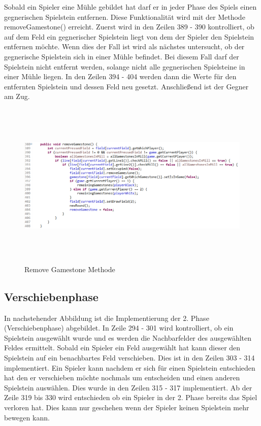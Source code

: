 \documentclass[oneside]{ausarbeitung}
\begin{document}
Sobald ein Spieler eine Mühle gebildet hat darf er in jeder Phase des Spiels einen gegnerischen Spielstein entfernen. Diese Funktionalität wird mit der Methode removeGamestone() erreicht. Zuerst wird in den Zeilen 389 - 390 kontrolliert, ob auf dem Feld ein gegnerischer Spielstein liegt von dem der Spieler den Spielstein entfernen möchte. Wenn dies der Fall ist wird als nächstes untersucht, ob der gegnerische Spielstein sich in einer Mühle befindet. Bei diesem Fall darf der Spielstein nicht entfernt werden, solange nicht alle gegnerischen Spielsteine in einer Mühle liegen. In den Zeilen 394 - 404 werden dann die Werte für den entfernten Spielstein und dessen Feld neu gesetzt. Anschließend ist der Gegner am Zug.

\begin{figure}[ht]
	\centering
	\includegraphics[width=15cm,height=8cm]{images/removeGamestoneMethode.png}
	\caption[Remove Gamestone Methode]{Remove Gamestone Methode}
\end{figure}

\subsection{Verschiebenphase}

In nachstehender Abbildung ist die Implementierung der 2. Phase (Verschiebenphase) abgebildet. In Zeile 294 - 301 wird kontrolliert, ob ein Spielstein ausgewählt wurde und es werden die Nachbarfelder des ausgewählten Feldes ermittelt. Sobald ein Spieler ein Feld ausgewählt hat kann dieser den Spielstein auf ein benachbartes Feld verschieben. Dies ist in den Zeilen 303 - 314 implementiert. Ein Spieler kann nachdem er sich für einen Spielstein entschieden hat den er verschieben möchte nochmals um entscheiden und einen anderen Spielstein auswählen. Dies wurde in den Zeilen 315 - 317 implementiert. Ab der Zeile 319 bis 330 wird entschieden ob ein Spieler in der 2. Phase bereits das Spiel verloren hat. Dies kann nur geschehen wenn der Spieler keinen Spielstein mehr bewegen kann.
\end{document}
